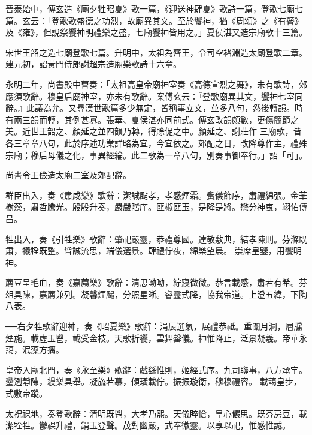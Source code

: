 \begin{pinyinscope}
 晉泰始中，傅玄造《廟夕牲昭夏》歌一篇，《迎送神肆夏》歌詩一篇，登歌七廟七篇。玄云：「登歌歌盛德之功烈，故廟異其文。至於饗神，猶《周頌》之《有瞽》及《雍》，但說祭饗神明禮樂之盛，七廟饗神皆用之。」夏侯湛又造宗廟歌十三篇。



 宋世王韶之造七廟登歌七篇。升明中，太祖為齊王，令司空褚淵造太廟登歌二章。建元初，詔黃門侍郎謝超宗造廟樂歌詩十六章。



 永明二年，尚書殿中曹奏：「太祖高皇帝廟神室奏《高德宣烈之舞》，未有歌詩，郊應須歌辭。穆皇后廟神室，亦未有歌辭。案傅玄云：『登歌廟異其文，饗神七室同辭。』此議為允。又尋漢世歌篇多少無定，皆稱事立文，並多八句，然後轉韻。時有兩三韻而轉，其例甚寡。張華、夏侯湛亦同前式。傅玄改韻頗數，更傷簡節之美。近世王韶之、顏延之並四韻乃轉，得賒促之中。顏延之、謝莊作
 三廟歌，皆各三章章八句，此於序述功業詳略為宜，今宜依之。郊配之日，改降尊作主，禮殊宗廟；穆后母儀之化，事異經綸。此二歌為一章八句，別奏事御奉行。」詔「可」。



 尚書令王儉造太廟二室及郊配辭。



 群臣出入，奏《肅咸樂》歌辭：潔誠颭孝，孝感煙霜。夤儀飾序，肅禮綿張。金華樹藻，肅哲騰光。殷殷升奏，嚴嚴階庠。匪椒匪玉，是降是將。懋分神衷，翊佑傳昌。



 牲出入，奏《引牲樂》歌辭：肇祀嚴靈，恭禮尊國。達敬敷典，結孝陳則。芬滌既肅，犧牷既整。聳誠流思，端儀選景。肆禮佇夜，綿樂望晨。
 崇席皇鑒，用饗明神。



 薦豆呈毛血，奏《嘉薦樂》歌辭：清思眑眑，紵寢微微。恭言載感，肅若有希。芬俎具陳，嘉薦兼列。凝馨煙颺，分照星晰。睿靈式降，協我帝道。上澄五緯，下陶八表。



 ──右夕牲歌辭迎神，奏《昭夏樂》歌辭：涓辰選氣，展禮恭祗。重闈月洞，層牖煙施。載虛玉鬯，載受金枝。天歌折饗，雲舞罄儀。神惟降止，泛景凝羲。帝華永藹，泯藻方摛。



 皇帝入廟北門，奏《永至樂》歌辭：戲繇惟則，姬經式序。九司聯事，八方承宇。鑾迾靜陳，縵樂具舉。凝旒若慕，傾璜載佇。振振璇衛，穆穆禮容。
 載藹皇步，式敷帝蹤。



 太祝祼地，奏登歌辭：清明既鬯，大孝乃熙。天儀睟愴，皇心儼思。既芬房豆，載潔牷牲。鬱祼升禮，鋗玉登聲。茂對幽嚴，式奉徽靈。以享以祀，惟感惟誠。




\end{pinyinscope}
